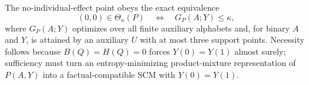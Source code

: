 The no-individual-effect point obeys the exact equivalence \[(0,0)\in\Theta_\kappa(P)\quad\Longleftrightarrow\quad G_P(A;Y)\leq\kappa,\] where \(G_P(A;Y)\) optimizes over all finite auxiliary alphabets and, for binary \(A\) and \(Y\), is attained by an auxiliary \(U\) with at most three support points. Necessity follows because \(B(Q)=H(Q)=0\) forces \(Y(0)=Y(1)\) almost surely; sufficiency must turn an entropy-minimizing product-mixture representation of \(P(A,Y)\) into a factual-compatible SCM with \(Y(0)=Y(1)\).